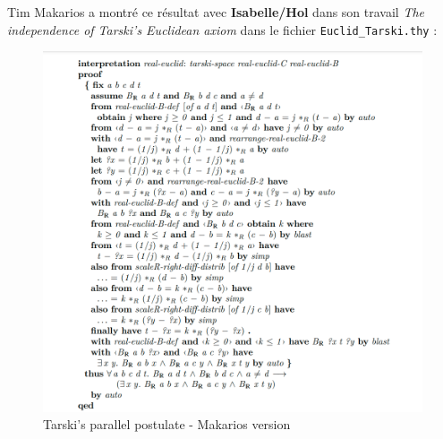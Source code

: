 \documentclass[8pt,a4paper]{article}
\theoremstyle{plain}
\begin{document}
  Tim Makarios a montré ce résultat avec \textbf{Isabelle/Hol} dans son travail
\textit{The independence of Tarski's Euclidean axiom}
\cite{Tarskis_Geometry-AFP}
dans le fichier \verb+Euclid_Tarski.thy+ :
  \begin{figure}[H] %
  \centering
    \includegraphics[width=150mm]{MakariosAxiom10.pdf}
\caption{Tarski's parallel postulate - Makarios version\label{TarskiParallelPostulateMakarios}}
\end{figure}
\end{document}
